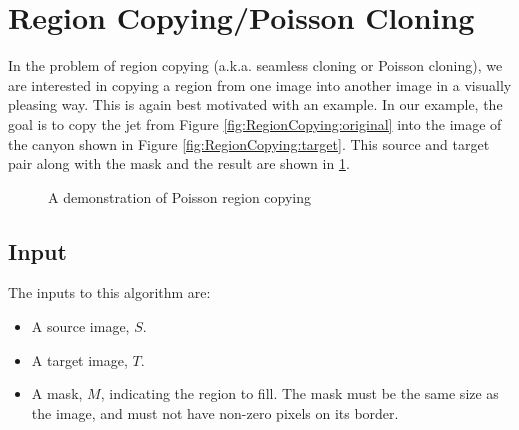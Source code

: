 \documentclass{InsightArticle}
\begin{document}
\section{Region Copying/Poisson Cloning}
\label{sec:RegionCopying}
In the problem of region copying (a.k.a. seamless cloning or Poisson cloning), we are interested in copying a region from one image into another image in a visually pleasing way. This is again best motivated with an example. In our example, the goal is to copy the jet from Figure \ref{fig:RegionCopying:original} into the image of the canyon shown in Figure \ref{fig:RegionCopying:target}. This source and target pair along with the mask and the result are shown in \ref{fig:RegionCopying}.

\begin{figure}[H]
\centering
{}
\caption{A demonstration of Poisson region copying}
\label{fig:RegionCopying}
\end{figure}

\subsection{Input}
The inputs to this algorithm are:
\begin{itemize}
\item A source image, $S$.
\item A target image, $T$.
\item A mask, $M$, indicating the region to fill. The mask must be the same size as the image, and must not have non-zero pixels on its border.
\end{itemize}
\end{document}
